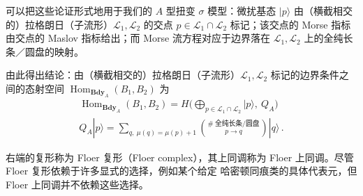 可以把这些论证形式地用于我们的 $A$ 型扭变 $\sigma$ 模型：微扰基态 $|p\rangle$ 由（横截相交的）拉格朗日（子流形）$\mathcal{L}_1,\mathcal{L}_2$ 的交点 $p\in\mathcal{L}_1\cap\mathcal{L}_2$ 标记；该交点的 Morse 指标由交点的 Maslov 指标给出；而 Morse 流方程对应于边界落在 $\mathcal{L}_1,\mathcal{L}_2$ 上的全纯长条／圆盘的映射。

由此得出结论：由（横截相交的）拉格朗日（子流形）$\mathcal{L}_1,\mathcal{L}_2$ 标记的边界条件之间的态射空间 $\operatorname{Hom}_{\mathbf{Bdy}_A}(B_1,B_2)$ 为
\begin{equation}\tag{2.51}
\begin{gathered}
\operatorname{Hom}_{\mathbf{Bdy}_A}(B_1,B_2)
= H\Big(\bigoplus_{p\in\mathcal{L}_1\cap\mathcal{L}_2}|p\rangle,\ Q_A\Big)\\
Q_A|p\rangle = \sum_{q,\ \mu(q)=\mu(p)+1}
\binom{\#\ \text{全纯长条/圆盘}}{p\to q}|q\rangle\,.
\end{gathered}
\end{equation}

右端的复形称为 Floer 复形（Floer complex），其上同调称为 Floer 上同调。尽管 Floer 复形依赖于许多显式的选择，例如某个给定 哈密顿同痕类的具体代表元，但 Floer 上同调并不依赖这些选择。

